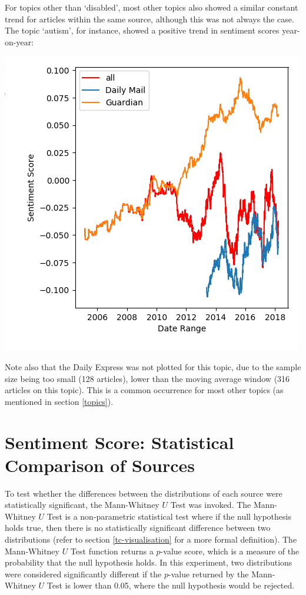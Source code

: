 \documentclass{report}
\begin{document}
For topics other than `disabled', most other topics also showed a similar constant trend for articles within the same source, although this was not always the case. 
The topic `autism', for instance, showed a positive trend in sentiment scores year-on-year:

\begin{center}
	\includegraphics[width=0.5\linewidth]{autism.png}
\end{center}

Note also that the Daily Express was not plotted for this topic, due to the sample size being too small (128 articles), lower than the moving average window (316 articles on this topic). 
This is a common occurrence for most other topics (as mentioned in section \ref{topics}).

\section{Sentiment Score: Statistical Comparison of Sources} \label{Sentiment score: statistical comparison of different sources}

To test whether the differences between the distributions of each source were statistically significant, the Mann-Whitney $U$ Test \cite{mann1947test} was invoked.
The Mann-Whitney $U$ Test is a non-parametric statistical test where if the null hypothesis holds true, then there is no statistically significant difference between two distributions (refer to section \ref{tc-visualisation} for a more formal definition).
The Mann-Whitney $U$ Test function returns a $p$-value score, which is a measure of the probability that the null hypothesis holds.
In this experiment, two distributions were considered significantly different if the $p$-value returned by the Mann-Whitney $U$ Test is lower than 0.05, where the null hypothesis would be rejected.
\end{document}
